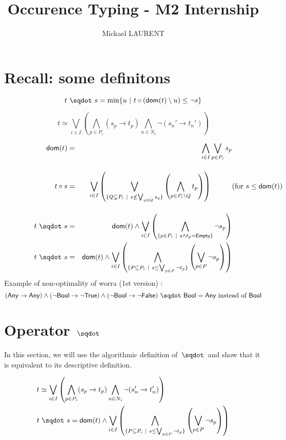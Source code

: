 \documentclass[a4paper]{article}%
\title{\vspace{1.5cm}Occurence Typing - M2 Internship}
\author{Mickael LAURENT}
\date{\vspace{-5ex}}
\begin{document}
    \maketitle

    \section{Recall: some definitons}

    \[ \worra t s = \min \{ u \alt \apply t {(\dom t \setminus u)} \leq \neg s \} \]

    \[ t \simeq \bigvee_{i\in I}\left(\bigwedge_{p\in P_i}(s_p\to t_p)\bigwedge_{n\in N_i}\neg(s_n'\to t_n')\right) \]

    \begin{eqnarray*}
        \dom{t}    & = & \bigwedge_{i\in I}\bigvee_{p\in P_i}s_p\\[4mm]
        \apply t s & = & \bigvee_{i\in I}\left(\bigvee_{\{Q\subsetneq P_i\alt s\not\leq\bigvee_{q\in Q}s_q\}}\left(\bigwedge_{p\in P_i\setminus Q}t_p\right)\right)\hspace*{1cm}\makebox[0cm][l]{(for $s\leq\dom{t}$)}\\[4mm]
        \worra t s & = & \dom t \wedge\bigvee_{i\in I}\left(\bigwedge_{\{p\in P_i\alt s\wedge t_p=\Empty\}}\neg s_p \right)\\
        \worra t s & = & \dom t \wedge\bigvee_{i\in I}\left(\bigwedge_{\{P \subseteq P_i\alt s \leq \bigvee_{p \in P} \neg t_p\}} \left(\bigvee_{p \in P} \neg s_p \right)\right)
    \end{eqnarray*}
    Example of non-optimality of worra (1st version) :
    \[ \worra {(\Any \rightarrow \Any) \land (\neg \Bool \rightarrow \neg \True) \land (\neg \Bool \rightarrow \neg \False)} \Bool = \Any \text{ instead of } \Bool \]
    \pagebreak

    \section{Operator $\worra {} {}$}

    In this section, we will use the algorithmic definition of $\worra {} {}$ and show that it is equivalent to its
    descriptive definition.

    \begin{eqnarray*}
        &t \simeq \bigvee_{i\in I}\left(\bigwedge_{p\in P_i}(s_p\to t_p)\bigwedge_{n\in N_i}\neg(s_n'\to t_n')\right)\\
        &\worra t s = \dom t \wedge\bigvee_{i\in I}\left(\bigwedge_{\{P \subseteq P_i\alt s \leq \bigvee_{p \in P} \neg t_p\}} \left(\bigvee_{p \in P} \neg s_p \right)\right)
    \end{eqnarray*}
\end{document}
